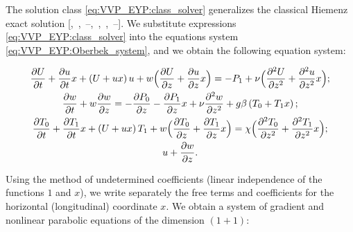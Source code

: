The solution class \eqref{eq:VVP_EYP:class_solver} generalizes the classical Hiemenz exact solution [,~,~--,~,~,~--]. We substitute expressions \eqref{eq:VVP_EYP:class_solver} into the equations system \eqref{eq:VVP_EYP:Oberbek_system}, and we obtain the following equation system:

\begin{gather}

\frac{\partial U}{\partial t} +\frac{\partial u}{\partial t} x+ \left(U + u x\right)u+

w\Bigl(\frac{\partial U}{\partial z} +\frac{\partial u}{\partial z} x \Bigr)=-P_1+\nu \Bigl(\frac{\partial^2 U}{\partial z^2}+\frac{\partial^2 u}{\partial z^2}  x\Bigr);

\\ \frac{\partial w}{\partial t} + w \frac{\partial w}{\partial z}=-\frac{\partial P_0}{\partial z}-\frac{\partial P_1}{\partial z} x+\nu \frac{\partial^2 w}{\partial z^2}+g\beta \left(T_0 + T_1 x\right);

\\

\frac{\partial T_0}{\partial t}+\frac{\partial T_1}{\partial t} x +\left(U + u x\right) T_1 +

w \Bigl( \frac{\partial T_0}{\partial z} + \frac{\partial T_1}{\partial z} x\Bigr)=

\chi \Bigl(\frac{\partial^2 T_0}{\partial z^2}+\frac{\partial^2 T_1}{\partial z^2} x\Bigr);

\\

u + \frac{\partial w}{\partial z}.

\end{gather}

Using the method of undetermined coefficients (linear independence of the functions $1$ and $x$), we write separately the free terms and coefficients for the horizontal (longitudinal) coordinate $x$. We obtain a system of gradient and nonlinear parabolic equations of the dimension $(1+1)$:

